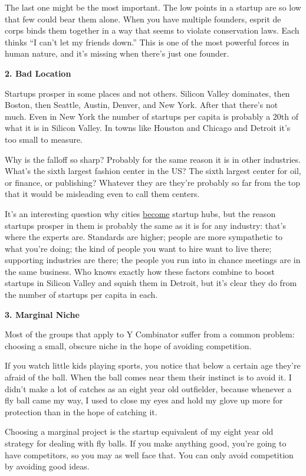 \documentclass[12pt]{book}
\begin{document}
The last one might be the most important. The low points in a startup
are so low that few could bear them alone. When you have multiple
founders, esprit de corps binds them together in a way that seems to
violate conservation laws. Each thinks ``I can't let my friends down.''
This is one of the most powerful forces in human nature, and it's
missing when there's just one founder.

\textbf{2. Bad Location}

Startups prosper in some places and not others. Silicon Valley
dominates, then Boston, then Seattle, Austin, Denver, and New York.
After that there's not much. Even in New York the number of startups per
capita is probably a 20th of what it is in Silicon Valley. In towns like
Houston and Chicago and Detroit it's too small to measure.

Why is the falloff so sharp? Probably for the same reason it is in other
industries. What's the sixth largest fashion center in the US? The sixth
largest center for oil, or finance, or publishing? Whatever they are
they're probably so far from the top that it would be misleading even to
call them centers.

It's an interesting question why cities
\href{siliconvalley.html}{become} startup hubs, but the reason startups
prosper in them is probably the same as it is for any industry: that's
where the experts are. Standards are higher; people are more sympathetic
to what you're doing; the kind of people you want to hire want to live
there; supporting industries are there; the people you run into in
chance meetings are in the same business. Who knows exactly how these
factors combine to boost startups in Silicon Valley and squish them in
Detroit, but it's clear they do from the number of startups per capita
in each.

\textbf{3. Marginal Niche}

Most of the groups that apply to Y Combinator suffer from a common
problem: choosing a small, obscure niche in the hope of avoiding
competition.

If you watch little kids playing sports, you notice that below a certain
age they're afraid of the ball. When the ball comes near them their
instinct is to avoid it. I didn't make a lot of catches as an eight year
old outfielder, because whenever a fly ball came my way, I used to close
my eyes and hold my glove up more for protection than in the hope of
catching it.

Choosing a marginal project is the startup equivalent of my eight year
old strategy for dealing with fly balls. If you make anything good,
you're going to have competitors, so you may as well face that. You can
only avoid competition by avoiding good ideas.
\end{document}
